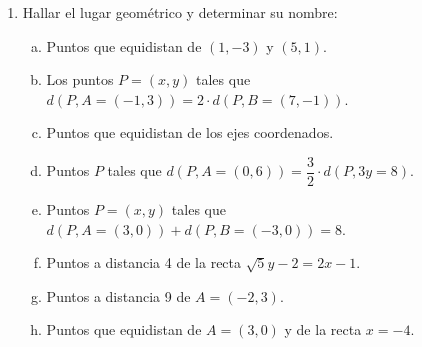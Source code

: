 \documentclass[11pt]{article}
\begin{document}
\begin{enumerate}[\hspace{-5mm}$1)$]
\item Hallar el lugar geométrico y determinar su nombre:
\begin{enumerate}[a)]
\item Puntos que equidistan de $(1, -3)$ y $(5, 1)$.
\item Los puntos $P = (x, y)$ tales que $d(P, A = (-1, 3)) = 2 \cdot d(P, B = (7, -1))$.
\item Puntos que equidistan de los ejes coordenados.
\item Puntos $P$ tales que $d(P, A = (0,6)) = \dfrac{3}{2} \cdot d(P, 3y = 8)$.
\item Puntos $P = (x, y)$ tales que $d(P, A = (3, 0)) + d(P, B = (-3, 0)) = 8$.
\item Puntos a distancia 4 de la recta $\sqrt{5}y - 2 = 2x - 1$.
\item Puntos a distancia 9 de $A = (-2, 3)$.
\item Puntos que equidistan de $A = (3, 0)$ y de la recta $x = -4$.
\end{enumerate}

\end{enumerate}
\end{document}
